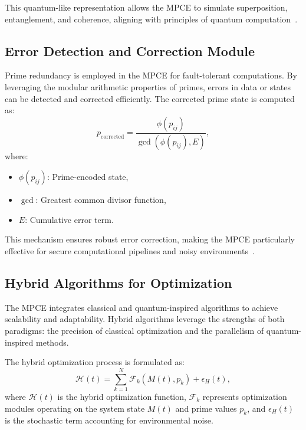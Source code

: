 \documentclass{article}
\theoremstyle{plain}
\begin{document}
This quantum-like representation allows the MPCE to simulate superposition, entanglement, and coherence, aligning with principles of quantum computation~\cite{feynman2010quantum, deutsch1985quantum}.

\subsection{Error Detection and Correction Module}

Prime redundancy is employed in the MPCE for fault-tolerant computations. By leveraging the modular arithmetic properties of primes, errors in data or states can be detected and corrected efficiently. The corrected prime state is computed as:
\begin{equation}
    p_{\text{corrected}} = \frac{\phi(p_{ij})}{\gcd(\phi(p_{ij}), E)},
\end{equation}
where:
\begin{itemize}
    \item \( \phi(p_{ij}) \): Prime-encoded state,
    \item \( \gcd \): Greatest common divisor function,
    \item \( E \): Cumulative error term.
\end{itemize}

This mechanism ensures robust error correction, making the MPCE particularly effective for secure computational pipelines and noisy environments~\cite{haroche2013nobel, shor1994algorithms}.

\subsection{Hybrid Algorithms for Optimization}

The MPCE integrates classical and quantum-inspired algorithms to achieve scalability and adaptability. Hybrid algorithms leverage the strengths of both paradigms: the precision of classical optimization and the parallelism of quantum-inspired methods.

The hybrid optimization process is formulated as:
\begin{equation}
    \mathcal{H}(t) = \sum_{k=1}^N \mathcal{F}_k \left( M(t), p_k \right) + \epsilon_H(t),
\end{equation}
where \( \mathcal{H}(t) \) is the hybrid optimization function, \( \mathcal{F}_k \) represents optimization modules operating on the system state \( M(t) \) and prime values \( p_k \), and \( \epsilon_H(t) \) is the stochastic term accounting for environmental noise.
\end{document}

